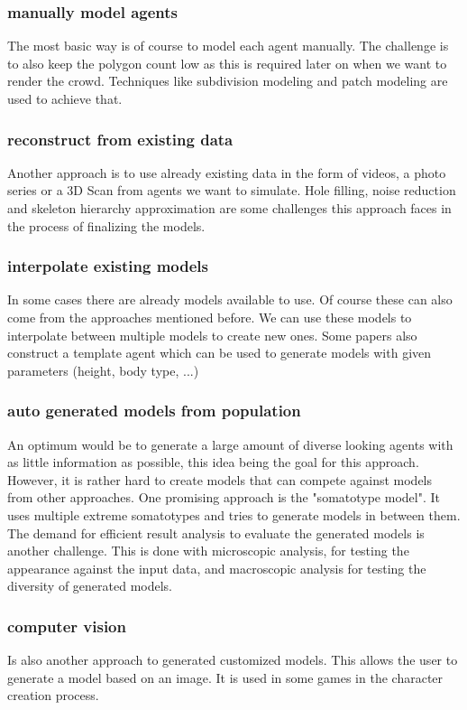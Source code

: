 \documentclass{acmsiggraph}               %
\begin{document}
\subsubsection{manually model agents}
The most basic way is of course to model each agent manually. The challenge is to also keep the polygon count low as this is required later on when we want to render the crowd. Techniques like subdivision modeling and patch modeling are used to achieve that.
\subsubsection{reconstruct from existing data}
Another approach is to use already existing data in the form of videos, a photo series or a 3D Scan from agents we want to simulate. Hole filling, noise reduction and skeleton hierarchy approximation are some challenges this approach faces in the process of finalizing the models. 
\subsubsection{interpolate existing models}
In some cases there are already models available to use. Of course these can also come from the approaches mentioned before. We can use these models to interpolate between multiple models to create new ones. Some papers also construct a template agent which can be used to generate models with given parameters (height, body type, ...)
\subsubsection{auto generated models from population}
An optimum would be to generate a large amount of diverse looking agents with as little information as possible, this idea being the goal for this approach. However, it is rather hard to create models that can compete against models from other approaches. One promising approach is the "somatotype model". It uses multiple extreme somatotypes and tries to generate models in between them. The demand for efficient result analysis to evaluate the generated models is another challenge. This is done with microscopic analysis, for testing the appearance against the input data, and macroscopic analysis for testing the diversity of generated models. 
\subsubsection{computer vision}
Is also another approach to generated customized models. This allows the user to generate a model based on an image. It is used in some games in the character creation process. 
\end{document}
